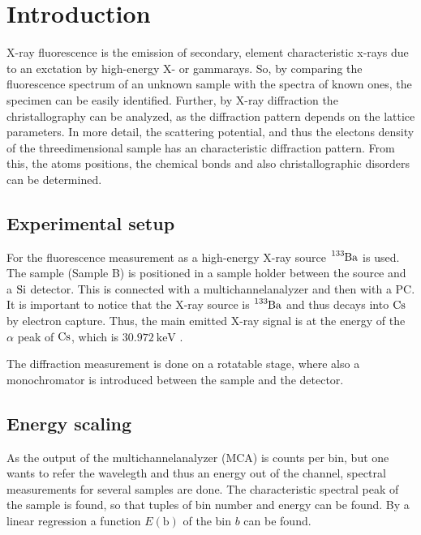 


\section{Introduction}
\label{sec:Introduction}

X-ray fluorescence is the emission of secondary, element characteristic x-rays due to an exctation by high-energy X- or gammarays.
So, by comparing the fluorescence spectrum of an unknown sample with the spectra of known ones, the specimen can be easily identified.
Further, by X-ray diffraction the christallography can be analyzed, as the diffraction pattern depends on the lattice parameters.
In more detail, the scattering potential, and thus the electons density of the threedimensional sample has an characteristic diffraction pattern.
From this, the atoms positions, the chemical bonds and also christallographic disorders can be determined.

\subsection{Experimental setup}
\label{sec:setup}

For the fluorescence measurement as a high-energy X-ray source $\ce{^{133}Ba}$ is used. 
The sample (Sample B) is positioned in a sample holder between the source and a $\ce{Si}$ detector.
This is connected with a multichannelanalyzer and then with a PC.
It is important to notice that the X-ray source is $\ce{^{133}Ba}$ and thus decays into $\ce{Cs}$ by electron capture.
Thus, the main emitted X-ray signal is at the energy of the $\alpha$ peak of $\ce{Cs}$, which is $\SI{30.972}{\kilo\eV}$ \cite{Ba-source}.

The diffraction measurement is done on a rotatable stage, where also a monochromator is introduced between the sample and the detector.

\subsection{Energy scaling}
\label{sec:E_scaling}
As the output of the multichannelanalyzer (MCA) is counts per bin, but one wants to refer the wavelegth and thus an energy out of the channel, 
spectral measurements for several samples are done.
The characteristic spectral peak of the sample is found, so that tuples of bin number and energy can be found.
By a linear regression a function $E (\text{b})$  of the bin $b$ can be found.
